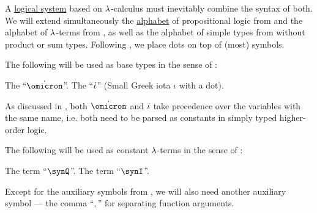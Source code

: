 \begin{definition}\label{def:simply_typed_hol_alphabet}\mimprovised
  A \hyperref[con:logical_system]{logical system} based on \( {\mathrm \lambda} \)-calculus must inevitably combine the syntax of both. We will extend simultaneously the \hyperref[def:formal_language/alphabet]{alphabet} of propositional logic from  and the alphabet of \( {\mathrm \lambda} \)-terms from , as well as the alphabet of simple types from  without product or sum types. Following , we place dots on top of (most) symbols.

  \begin{thmenum}
     The following will be used as base types in the sense of :
    \begin{thmenum}[series=def:simply_typed_hol_alphabet]
       The  \enquote{\( \syn\omicron \)}.
       The  \enquote{\( \dot{\iota} \)} (Small Greek iota \( \iota \) with a dot).
    \end{thmenum}

    As discussed in , both \( \syn\omicron \) and \( \dot{\iota} \) take precedence over the variables with the same name, i.e. both need to be parsed as constants in simply typed higher-order logic.

     The following will be used as constant \( {\mathrm \lambda} \)-terms in the sense of :
    \begin{thmenum}[resume=def:simply_typed_hol_alphabet]
       The  term \enquote{\( \synQ \)}.
       The  term \enquote{\( \synI \)}.
    \end{thmenum}

     Except for the auxiliary symbols from , we will also need another auxiliary symbol --- the comma \enquote{\( , \)} for separating function arguments.


\end{thmenum}
\end{definition}
